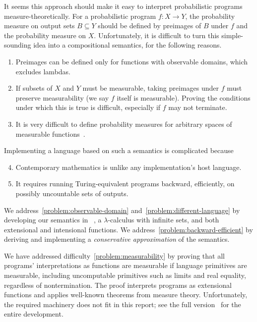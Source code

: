\documentclass{llncs}
\begin{document}
It seems this approach should make it easy to interpret probabilistic programs measure-theoretically.
For a probabilistic program $f : X \to Y$, the probability measure on output sets $B \subseteq Y$ should be defined by preimages of $B$ under $f$ and the probability measure on $X$.
Unfortunately, it is difficult to turn this simple-sounding idea into a compositional semantics, for the following reasons.
\begin{enumerate}
	\item Preimages can be defined only for functions with observable domains, which excludes lambdas.%
\label{problem:observable-domain}
	\item If subsets of $X$ and $Y$ must be measurable, taking preimages under $f$ must preserve measurability (we say $f$ itself is measurable). Proving the conditions under which this is true is difficult, especially if $f$ may not terminate.%
\label{problem:measurability}
	\item It is very difficult to define probability measures for arbitrary spaces of measurable functions~\cite{cit:aumann-1961ijm-borel}.%
\label{problem:higher-orderness}
\end{enumerate}
Implementing a language based on such a semantics is complicated because
\begin{enumerate}
	\setcounter{enumi}{3}
	\item Contemporary mathematics is unlike any implementation's host language.%
\label{problem:different-language}
	\item It requires running Turing-equivalent programs backward, efficiently, on possibly uncountable sets of outputs.%
\label{problem:backward-efficient}
\end{enumerate}

We address~\ref{problem:observable-domain} and~\ref{problem:different-language} by developing our semantics in \lzfclang~\cite{cit:toronto-2012flops-lzfc}, a $\lambda$-calculus with infinite sets, and both extensional and intensional functions.
We address~\ref{problem:backward-efficient} by deriving and implementing a \emph{conservative approximation} of the semantics.

We have addressed difficulty~\ref{problem:measurability} by proving that all programs' interpretations as functions are measurable if language primitives are measurable, including uncomputable primitives such as limits and real equality, regardless of nontermination.
The proof interprets programs as extensional functions and applies well-known theorems from measure theory.
Unfortunately, the required machinery does not fit in this report; see the full version~\cite{cit:toronto-2014esop-long} for the entire development.
\end{document}
